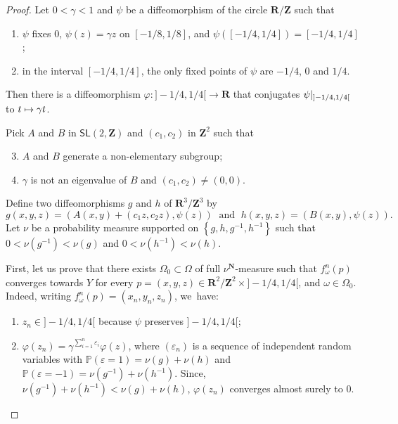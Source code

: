 \documentclass[JEP,XML,SOM,Unicode,published]{cedram}
\newenvironment{enumeratei}
{\bgroup\def\theenumi{\roman{enumi}}\def\theenumii{\arabic{enumii}}\begin{enumerate}}
{\end{enumerate}\egroup}
\newcommand\mto{\mathchoice{\longmapsto}{\mapsto}{\mapsto}{\mapsto}}
\let\e\varepsilon
\newcommand{\set}[1]{\left\{#1\right\}}
\newcommand{\rest}[1]{ \arrowvert_{#1}}
\newcommand{\inv}{^{-1}}
\newcommand{\pp}{\mathbb{P}}\let\P\pp
\def\R{\mathbf{R}}
\def\Z{\mathbf{Z}}
\def\N{\mathbf{N}}
\newcommand\SL{{\mathsf{SL}}}
\theoremstyle{plain}
\theoremstyle{definition}
\begin{document}
\begin{proof}

Let $0<\gamma<1$ and $\psi$ be a diffeomorphism of the circle $\R/\Z$ such that
\begin{enumeratei}
\item\label{hyp:i} $\psi$ fixes $0$, $\psi(z)=\gamma z$ on $[-1/8,1/8]$, and $\psi([-1/4,1/4]) = [-1/4,1/4]$;
\item\label{hyp:ii} in the interval $[-1/4, 1/4]$, the only fixed points of $\psi$ are $-1/4$, $0$ and $1/4$.
\end{enumeratei}
Then there is a diffeomorphism $\varphi\colon ]-1/4,1/4[\to \R$ that conjugates $\psi\rest{ ]-1/4,1/4[}$ to $t\mto \gamma t$.

Pick $A$ and $ B$ in $ \SL(2, \Z)$ and $(c_1,c_2)$ in $\Z^2$ such that
\begin{enumeratei}\setcounter{enumi}{2}
\item\label{hyp:iii}
$A$ and $B$ generate a non-elementary subgroup;
\item\label{hyp:iv}
$\gamma$ is not an eigenvalue of $B$
and $(c_1,c_2)\neq (0,0)$.
\end{enumeratei}
Define two diffeomorphisms $g$ and $h$ of $\R^3/\Z^3$ by
\begin{equation*}
g(x,y,z) = (A(x,y)+(c_1z, c_2z), \psi(z))\; \text{ and } \; h(x,y,z) = (B(x,y), \psi(z)).
\end{equation*}
Let $\nu$ be a probability measure supported on $\set{g, h, g\inv, h\inv}$ such that
$0<\nu(g\inv)<\nu(g)$ and $0<\nu(h\inv)<\nu(h)$.

First, let us prove that there exists $\Omega_0\subset \Omega$ of full
$\nu^\N$-measure such that $f_\omega^n(p)$ converges towards $Y$ for every $p = (x,y,z)\in \R^2/\Z^2 \times{}]-1/4, 1/4[$,
and $\omega\in \Omega_0$. Indeed, writing $f_\omega^n(p) = (x_n, y_n, z_n)$, we~have:
\begin{enumerate}
\item $z_n\in{} ]-1/4, 1/4[$ because $\psi$ preserves $]-1/4, 1/4[$;
\item $\varphi(z_n ) = \gamma^{\sum_{i=1}^{n} \e_i} \varphi(z)$, where
$(\e_n)$ is a sequence of independent random variables with
$\pp(\e =1 ) = \nu(g)+\nu(h)$ and $\pp(\e =-1 ) = \nu(g\inv)+\nu(h\inv)$. Since, $\nu(g\inv)+\nu(h\inv)< \nu(g)+\nu(h)$, $\varphi(z_n)$ converges almost surely to $0$.
\end{enumerate}


\end{proof}
\end{document}
